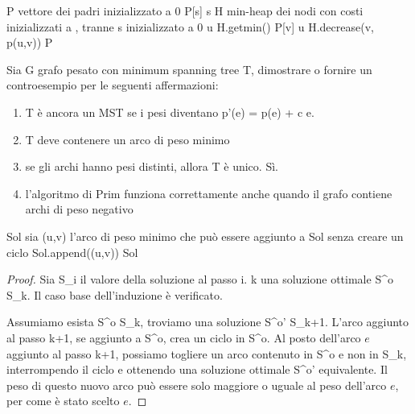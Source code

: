 \begin{algorithm}
\begin{algorithmic}
    \State P \gets vettore dei padri inizializzato a 0
    \State P[s] \gets s
    \State H \gets min-heap dei nodi con costi inizializzati a \infty, tranne s inizializzato a 0
        \State u \gets H.getmin()
                \State P[v] \gets u
                \State H.decrease(v, p(u,v))
            \EndIf
        \EndFor
    \EndWhile
    \State \Return P
\EndFunction
\end{algorithmic}
\end{algorithm}

Sia G grafo pesato con minimum spanning tree T,
dimostrare o fornire un controesempio per le seguenti affermazioni:
\begin{enumerate}
    \item T \`e ancora un MST se i pesi diventano p'(e) = p(e) + c \forall e.
    \item T deve contenere un arco di peso minimo
    \item se gli archi hanno pesi distinti, allora T \`e unico. S\`i.
    \item l'algoritmo di Prim funziona correttamente anche quando il grafo contiene archi di peso negativo
\end{enumerate}

\begin{algorithm}
\begin{algorithmic}
    \State Sol \gets \emptyset
        \State sia (u,v) l'arco di peso minimo che pu\`o essere aggiunto a Sol senza creare un ciclo
        \State Sol.append((u,v))
    \EndWhile
    \State \Return Sol
\EndFunction
\end{algorithmic}
\end{algorithm}

\begin{proof}
Sia S_i il valore della soluzione al passo i. \forall k \exists una soluzione ottimale S^{o} \supseteq S_k. Il caso base dell'induzione \`e verificato.

Assumiamo esista S^{o} \supseteq S_k, troviamo una soluzione S^{o'} \supseteq S_{k+1}. L'arco aggiunto al passo k+1, se aggiunto a S^{o}, crea un ciclo in S^{o}. Al posto dell'arco $e$ aggiunto al passo k+1, possiamo togliere un arco contenuto in S^{o} e non in S_k, interrompendo il ciclo e ottenendo una soluzione ottimale S^{o}' equivalente. Il peso di questo nuovo arco pu\`o essere solo maggiore o uguale al peso dell'arco $e$, per come \`e stato scelto $e$.
\end{proof}

